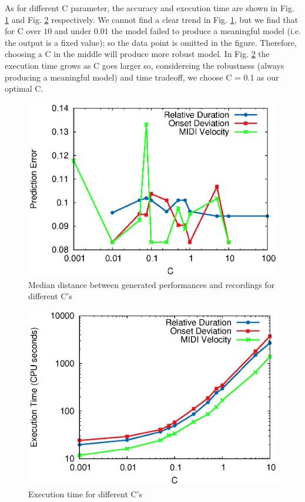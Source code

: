 As for different C parameter, the accuracy and execution time are shown in Fig. \ref{fig:c_accu} and Fig. \ref{fig:c_time} respectively. We cannot find a clear trend in Fig. \ref{fig:c_accu}, but we find that for C over $10$ and under $0.01$ the model failed to produce a meaningful model (i.e. the output is a fixed value); so the data point is omitted in the figure. Therefore, choosing a C in the middle will produce more robust model. In Fig. \ref{fig:c_time} the execution time grows as C goes larger so, considereing the robustness (always producing a meaningful model) and time tradeoff, we choose C = 0.1 as our optimal C.

\begin{figure}[tp]
   \begin{center}
      \includegraphics[width=\textwidth]{fig/C_accu}

   \end{center}
   \caption{Median distance between generated performances and recordings for different C's}
   \label{fig:c_accu}
\end{figure}
\begin{figure}[tp]
   \begin{center}
      \includegraphics[width=\textwidth]{fig/C_time}
   \end{center}
   \caption{Execution time for different C's}
   \label{fig:c_time}
\end{figure}
